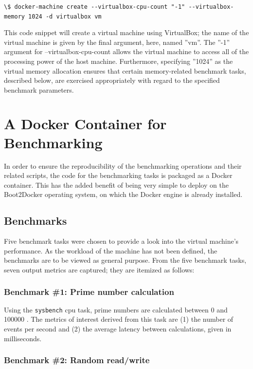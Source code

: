 \documentclass[sigconf]{acmart}
\begin{document}
\begin{lstlisting}
\$ docker-machine create --virtualbox-cpu-count "-1" --virtualbox-memory 1024 -d virtualbox vm
\end{lstlisting}

This code snippet will create a virtual machine using VirtualBox; the name of the virtual machine is given by the final argument, here, named ''vm''. The ''-1'' argument for --virtualbox-cpu-count allows the virtual machine to access all of the processing power of the host machine. Furthermore, specifying ''1024'' as the virtual memory allocation ensures that certain memory-related benchmark tasks, described below, are exercised appropriately with regard to the specified benchmark parameters.

\section{A Docker Container for Benchmarking}

In order to ensure the reproducibility of the benchmarking operations and their related scripts, the code for the benchmarking tasks is packaged as a Docker container. This has the added benefit of being very simple to deploy on the Boot2Docker operating system, on which the Docker engine is already installed.

\subsection{Benchmarks}

Five benchmark tasks were chosen to provide a look into the virtual machine's performance. As the workload of the machine has not been defined, the benchmarks are to be viewed as general purpose. From the five benchmark tasks, seven output metrics are captured; they are itemized as follows:

\subsubsection{Benchmark \#1: Prime number calculation}

Using the {\tt sysbench} cpu task, prime numbers are calculated between 0 and 100000 \cite{sysbench}. The metrics of interest derived from this task are (1) the number of events per second and (2) the average latency between calculations, given in milliseconds.

\subsubsection{Benchmark \#2: Random read/write}
\end{document}
